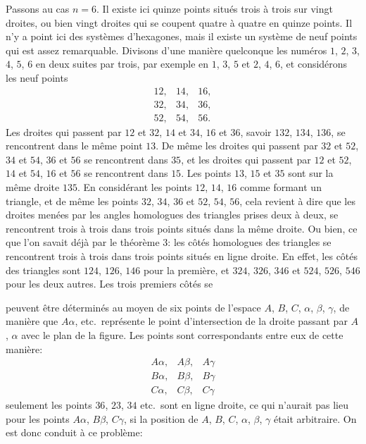 \documentclass[12pt,a4paper]{article}
\theoremstyle{plain}
\begin{document}
Passons au cas $n = 6$. Il existe ici quinze points situ\'es trois \`a trois sur vingt droites, ou bien vingt droites qui se coupent quatre \`a quatre en quinze points. Il n'y a point ici des syst\`emes d'hexagones, mais il existe un syst\`eme de neuf points qui est assez remarquable. Divisons d'une mani\`ere quelconque les num\'eros $1$, $2$, $3$, $4$, $5$, $6$ en deux suites par trois, par exemple en $1$, $3$, $5$ et $2$, $4$, $6$, et consid\'erons les neuf points
\[
\begin{array}{ccc}
12, & 14, & 16, \\
32, & 34, & 36, \\
52, & 54, & 56.
\end{array}
\]
Les droites qui passent par $12$ et $32$, $14$ et $34$, $16$ et $36$, savoir $132$, $134$, $136$, se rencontrent dans le m\^eme point $13$. De m\^eme les droites qui passent par $32$ et $52$, $34$ et $54$, $36$ et $56$ se rencontrent dans $35$, et les droites qui passent par $12$ et $52$, $14$ et $54$, $16$ et $56$ se rencontrent dans $15$. Les points $13$, $15$ et $35$ sont sur la m\^eme droite $135$. En consid\'erant les points $12$, $14$, $16$ comme formant un triangle, et de m\^eme les points $32$, $34$, $36$ et $52$, $54$, $56$, cela revient \`a dire que les droites men\'ees par les angles homologues des triangles prises deux \`a deux, se rencontrent trois \`a trois dans trois points situ\'es dans la m\^eme droite. Ou bien, ce que l'on savait d\'ej\`a par le th\'eor\`eme 3: les c\^ot\'es homologues des triangles se rencontrent trois \`a trois dans trois points situ\'es en ligne droite. En effet, les c\^ot\'es des triangles sont $124$, $126$, $146$ pour la premi\`ere, et $324$, $326$, $346$ et $524$, $526$, $546$ pour les deux autres. Les trois premiers c\^ot\'es se

\newpage


peuvent \^etre d\'etermin\'es au moyen de six points de l'espace $A$, $B$, $C$, $\alpha$, $\beta$, $\gamma$, de mani\`ere que $A\alpha$, etc.\ repr\'esente le point d'intersection de la droite passant par $A$, $\alpha$ avec le plan de la figure. Les points sont correspondants entre eux de cette mani\`ere:
\[
\begin{array}{ccc}
A\alpha, & A\beta, & A\gamma \\
B\alpha, & B\beta, & B\gamma \\
C\alpha, & C\beta, & C\gamma
\end{array}
\]
seulement les points $36$, $23$, $34$ etc.\ sont en ligne droite, ce qui n'aurait pas lieu pour les points $A\alpha$, $B\beta$, $C\gamma$, si la position de $A$, $B$, $C$, $\alpha$, $\beta$, $\gamma$ \'etait arbitraire. On est donc conduit \`a ce probl\`eme:
\end{document}
